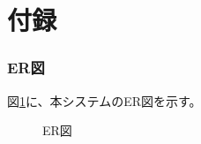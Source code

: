 \documentclass[a4j]{jarticle}
\begin{document}
\appendix
\part*{付録}

\setcounter{section}{0} %
\renewcommand{\thesection}{\Alph{section}} %
\setcounter{figure}{0} %
\renewcommand{\thefigure}{\Alph{section}}


\section{ER図}
図\ref{fig:ER}に、本システムのER図を示す。
\begin{figure}[H]
\begin{center}
\caption{ER図}
\label{fig:ER}
\end{center}
\end{figure}
\end{document}

